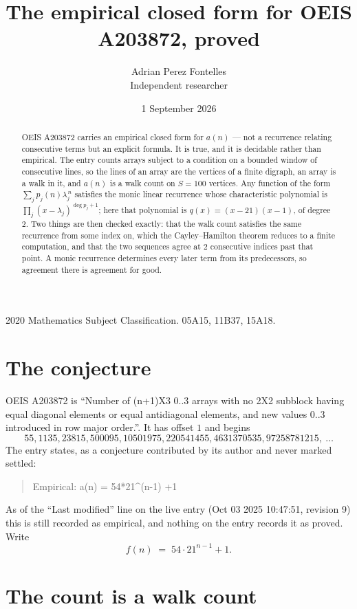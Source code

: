 \documentclass[11pt,a4paper]{article}
\title{The empirical closed form for OEIS A203872, proved}
\author{Adrian Perez Fontelles\\ \small Independent researcher}
\date{1 September 2026}
\theoremstyle{plain}
\theoremstyle{definition}
\begin{document}
\maketitle

\begin{abstract}
OEIS A203872 carries an empirical closed form for $a(n)$ --- not a recurrence relating
consecutive terms but an explicit formula. It is true, and it is decidable rather than
empirical. The entry counts arrays subject to a condition on a bounded window of consecutive lines, so the lines of an array are the
vertices of a finite digraph, an array is a walk in it, and $a(n)$ is a walk count on
$S=100$ vertices. Any function of the form $\sum_j p_j(n)\lambda_j^{\,n}$ satisfies the
monic linear recurrence whose characteristic polynomial is
$\prod_j(x-\lambda_j)^{\deg p_j+1}$; here that polynomial is $q(x)=(x-21)(x-1)$, of degree
$2$. Two things are then checked exactly: that the walk count satisfies the same
recurrence from some index on, which the Cayley--Hamilton theorem reduces to a finite
computation, and that the two sequences agree at $2$ consecutive indices past that
point. A monic recurrence determines every later term from its predecessors, so agreement
there is agreement for good.
\end{abstract}

\noindent\small 2020 Mathematics Subject Classification. 05A15, 11B37, 15A18.\normalsize

\section{The conjecture}

OEIS A203872 is ``Number of (n+1)X3 0..3 arrays with no 2X2 subblock having equal diagonal elements or equal antidiagonal elements, and new values 0..3 introduced in row major order.''. It has offset $1$ and begins
\[
55, 1135, 23815, 500095, 10501975, 220541455, 4631370535, 97258781215,\ \dots
\]
The entry states, as a conjecture contributed by its author and never marked settled:
\begin{quote}
Empirical: a(n) = 54*21\^{}(n-1) +1
\end{quote}
As of the ``Last modified'' line on the live entry (Oct 03 2025 10:47:51, revision 9) this is still
recorded as empirical, and nothing on the entry records it as proved. Write
\[
f(n)\;=\;54 \cdot 21^{n - 1} + 1.
\]

\section{The count is a walk count}
\end{document}
